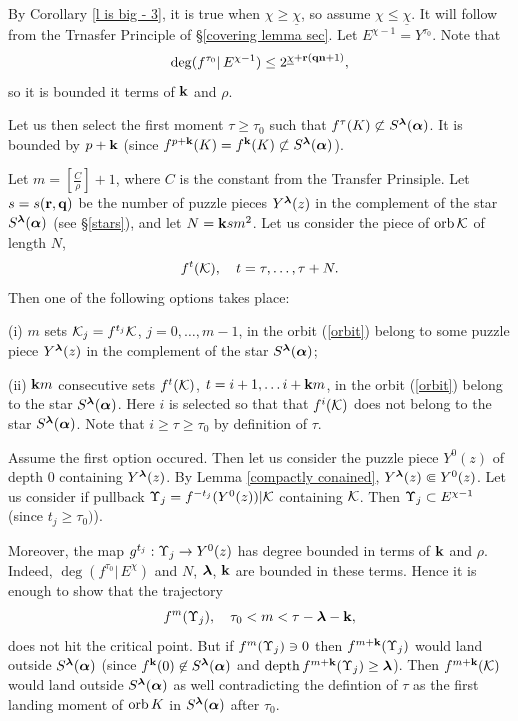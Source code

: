 \begin{pf}
  By Corollary \ref{l is big - 3}, it is true when  $\chi\geq \underline{\chi}$,
so assume  $\chi\leq \underline{\chi}$. 
It will follow from the Trnasfer Principle of \S \ref{covering lemma sec}. 
Let $E^{\chi-1} =  Y^{\tau_0}$.
Note that
$$
    \deg (f^{\tau_0}|\, E^{\chi-1} ) \leq 2^{\underline{\chi}+{\mathbf{r}}({\mathbf{q}}{\mathbf{n}}+1)},
$$    
so it is bounded it terms of ${\mathbf{k}}$ and $\rho$. 

Let us then select the first moment $\tau\geq \tau_0$ such that $f^\tau(K)\not\subset S^{{\boldsymbol{\lambda}}}({\mbox{\boldmath$\alpha$} })$.
It is bounded by $p+{\mathbf{k}}$ (since  $f^{p+{\mathbf{k}}}(K) = f^{{\mathbf{k}}} (K)\not\subset S^{{\boldsymbol{\lambda}}}({\mbox{\boldmath$\alpha$} }) $).   

Let   $m=[\frac{C}{\rho}]+1$, where $C$ is the constant from the Transfer Prinsiple.
Let $s=s({\mathbf{r}},{\mathbf{q}})$ be the number of puzzle pieces $Y^{{\boldsymbol{\lambda}}}(z)$ 
in the complement of the star $S^{{\boldsymbol{\lambda}}}({\mbox{\boldmath$\alpha$} })$ (see \S \ref{stars}),
 and let  $N= {\mathbf{k}}  s m^2 $.
Let us consider the piece of $\operatorname{orb} {\mathcal K}$ of length $N$,    
\begin{equation}\label{orbit}
      f^t({\mathcal K}), \quad t=\tau, \dots, \tau+N. 
\end{equation}
Then one of the following options takes place:

\ssk\nin (i) $m$ sets ${\mathcal K}_j= f^{t_j}{\mathcal K}$, $j=0,\dots, m-1$,  in the orbit (\ref{orbit})
  belong to some puzzle piece $Y^{{\boldsymbol{\lambda}}}(z)$ 
in the complement of the star $S^{{\boldsymbol{\lambda}}}({\mbox{\boldmath$\alpha$} })$;

\ssk\nin (ii)  ${\mathbf{k}}  m $ consecutive sets $f^t({\mathcal K})$, $t=i+1,\dots i+{\mathbf{k}} m$,
 in the orbit (\ref{orbit})
belong to the star $S^{{\boldsymbol{\lambda}}}({\mbox{\boldmath$\alpha$} })$.
Here $i$ is selected so that that $f^i({\mathcal K})$ does not belong to the star $S^{{\boldsymbol{\lambda}}}({\mbox{\boldmath$\alpha$} })$.
Note that $i\geq\tau\geq\tau_0$ by definition of $\tau$. 

\msk
Assume the first option occured. 
Then let us consider the puzzle piece $Y^0(z)$  of depth $0$ containing $Y^{{\boldsymbol{\lambda}}}(z)$.
By Lemma \ref{compactly conained}, $Y^{{\boldsymbol{\lambda}}}(z)\Subset Y^0(z)$.
Let us consider if pullback ${\Upsilon}_j= f^{-t_j}(Y^0(z))|{\mathcal K}$ containing ${\mathcal K}$. 
Then ${\Upsilon}_j\subset E^{\chi-1}$ (since $t_j\geq \tau_0)$). 

Moreover,  the map $g^{t_j} : {\Upsilon}_j\rightarrow Y^0(z)$ has degree bounded in terms of ${\mathbf{k}}$ and $\rho$.  
Indeed,   $\deg (f^{\tau_0}|\, E^\chi )$ and $N$, ${\boldsymbol{\lambda}}$, ${\mathbf{k}}$ are bounded in these terms.
Hence it is enough to show that the trajectory   
$$
   f^m ({\Upsilon}_j), \quad \tau_0<  m < \tau-{\boldsymbol{\lambda}}-{\mathbf{k}},
$$
does not hit the critical point.
But if $f^m({\Upsilon}_j)\ni 0$ then  $f^{m+{\mathbf{k}}}({\Upsilon}_j)$ would  land 
outside $S^{{\boldsymbol{\lambda}}}({\mbox{\boldmath$\alpha$} })$ (since $f^{\mathbf{k}}(0)\not \in S^{\boldsymbol{\lambda}}({\mbox{\boldmath$\alpha$} })$ and $\operatorname{depth} f^{m+{\mathbf{k}}}({\Upsilon}_j)\geq {\boldsymbol{\lambda}}$).
Then $f^{m+{\mathbf{k}}}({\mathcal K})$ would land outside $S^{{\boldsymbol{\lambda}}}({\mbox{\boldmath$\alpha$} })$ as well
contradicting the defintion of $\tau$ as the first landing moment 
of $\operatorname{orb} K$ in $S^{\boldsymbol{\lambda}}({\mbox{\boldmath$\alpha$} })$ after $\tau_0$. 


\end{pf}
